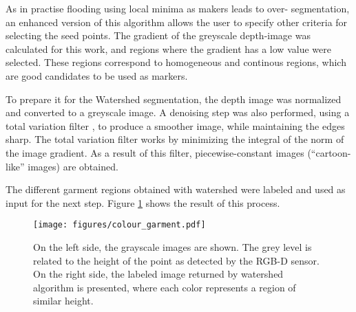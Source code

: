 As in practise flooding using local minima as makers leads to over- segmentation, an enhanced version of this algorithm allows the user to specify other criteria for selecting the seed points. The gradient of the greyscale depth-image was calculated for this work, and regions where the gradient has a low value were selected. These regions correspond to homogeneous and continous regions, which are good candidates to be used as markers.

To prepare it for the Watershed segmentation, the depth image was normalized and converted to a greyscale image. A denoising step was also performed, using a total variation filter , to produce a smoother image, while maintaining the edges sharp. The total variation filter works by minimizing the integral of the norm of the image gradient. As a result of this filter, piecewise-constant images (``cartoon-like'' images) are obtained.

The different garment regions obtained with watershed were labeled and used as input for the next step. Figure \ref{fig:watershed_labels} shows the result of this process.

\begin{figure}[thpb]
    \centering
    \texttt{[image: figures/colour\_garment.pdf]}
    \caption{On the left side, the grayscale images are shown. The grey level is related to the height of the point as detected by the RGB-D sensor. On the right side, the labeled image returned by watershed algorithm is presented, where each color represents a region of similar height.}
    \label{fig:watershed_labels}
\end{figure}